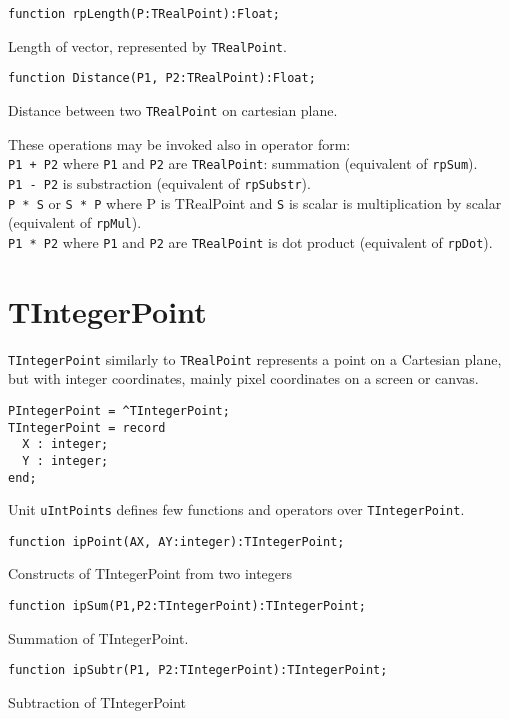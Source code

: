 \documentclass[12pt,a4paper,oneside]{article}
\newcommand{\code}[1]{\texttt{#1}}
\begin{document}
\begin{verbatim}
function rpLength(P:TRealPoint):Float;
\end{verbatim}\vspace{-6pt}
Length of vector, represented by \code{TRealPoint}.

\begin{verbatim}
function Distance(P1, P2:TRealPoint):Float;
\end{verbatim}\vspace{-6pt}
Distance between two \code{TRealPoint} on cartesian plane.

These operations may be invoked also in operator form:\\
\code{P1 + P2} where \code{P1} and \code{P2} are \code{TRealPoint}: summation (equivalent of \code{rpSum}).\\
\code{P1 - P2} is substraction (equivalent of \code{rpSubstr}).\\
\code{P * S} or \code{S * P} where P is TRealPoint and \code{S} is scalar is multiplication by scalar (equivalent of \code{rpMul}).\\
\code{P1 * P2} where \code{P1} and \code{P2} are \code{TRealPoint} is dot product (equivalent of \code{rpDot}).

\section{TIntegerPoint}
\code{TIntegerPoint} similarly to \code{TRealPoint} represents a point on a Cartesian plane, but with integer coordinates, mainly pixel coordinates on a screen or canvas.
\begin{verbatim}
PIntegerPoint = ^TIntegerPoint;
TIntegerPoint = record
  X : integer;
  Y : integer;
end;
\end{verbatim}
Unit \code{uIntPoints} defines few functions and operators over \code{TIntegerPoint}.
\begin{verbatim}
function ipPoint(AX, AY:integer):TIntegerPoint;
\end{verbatim}\vspace{-6pt}
Constructs of TIntegerPoint from two integers
\begin{verbatim}
function ipSum(P1,P2:TIntegerPoint):TIntegerPoint;
\end{verbatim}\vspace{-6pt}
Summation of TIntegerPoint.
\begin{verbatim}
function ipSubtr(P1, P2:TIntegerPoint):TIntegerPoint;
\end{verbatim}\vspace{-6pt}
Subtraction of TIntegerPoint
\end{document}
